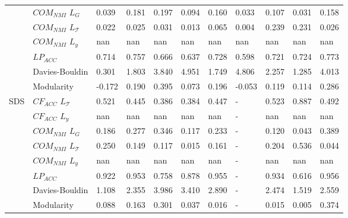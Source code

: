 \begin{tabular}{lllllllllll}
    & $COM_{NMI}$ $L_G$ &     0.039 &    0.181 &  0.197 &  0.094 &  0.160 &   0.033 &    0.107 &                  0.031 &                  0.158 \\
    & $COM_{NMI}$ $L_\mathcal{T}$ &     0.022 &    0.025 &  0.031 &  0.013 &  0.065 &   0.004 &    0.239 &                  0.231 &                  0.026 \\
    & $COM_{NMI}$ $L_y$ &       nan &      nan &    nan &    nan &    nan &     nan &      nan &                    nan &                    nan \\
    & $LP_{ACC}$ &     0.714 &    0.757 &  0.666 &  0.637 &  0.728 &   0.598 &    0.721 &                  0.724 &                  0.773 \\
    & Davies-Bouldin &     0.301 &    1.803 &  3.840 &  4.951 &  1.749 &   4.806 &    2.257 &                  1.285 &                  4.013 \\
    & Modularity &    -0.172 &    0.190 &  0.395 &  0.073 &  0.196 &  -0.053 &    0.119 &                  0.114 &                  0.286 \\
SDS & $CF_{ACC}$ $L_\mathcal{T}$ &     0.521 &    0.445 &  0.386 &  0.384 &  0.447 &       - &    0.523 &                  0.887 &                  0.492 \\
    & $CF_{ACC}$ $L_y$ &       nan &      nan &    nan &    nan &    nan &       - &      nan &                    nan &                    nan \\
    & $COM_{NMI}$ $L_G$ &     0.186 &    0.277 &  0.346 &  0.117 &  0.233 &       - &    0.120 &                  0.043 &                  0.389 \\
    & $COM_{NMI}$ $L_\mathcal{T}$ &     0.250 &    0.149 &  0.117 &  0.015 &  0.161 &       - &    0.204 &                  0.536 &                  0.044 \\
    & $COM_{NMI}$ $L_y$ &       nan &      nan &    nan &    nan &    nan &       - &      nan &                    nan &                    nan \\
    & $LP_{ACC}$ &     0.922 &    0.953 &  0.758 &  0.878 &  0.955 &       - &    0.934 &                  0.616 &                  0.956 \\
    & Davies-Bouldin &     1.108 &    2.355 &  3.986 &  3.410 &  2.890 &       - &    2.474 &                  1.519 &                  2.559 \\
    & Modularity &     0.088 &    0.163 &  0.301 &  0.037 &  0.016 &       - &    0.015 &                  0.005 &                  0.374 \\
\bottomrule
\end{tabular}
